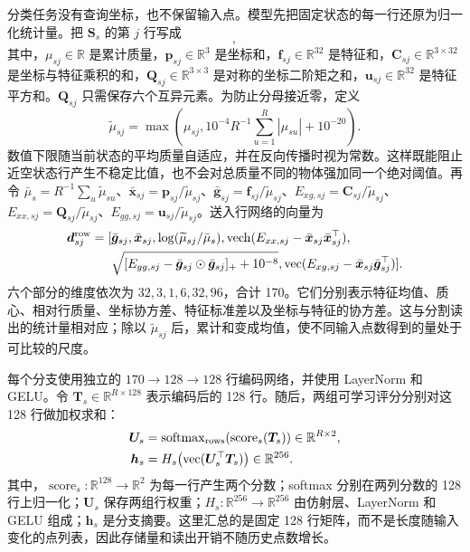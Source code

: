 \documentclass[UTF8,a4paper,11pt,fontset=windows]{ctexart}
\newcommand{\R}{\mathbb{R}}
\newcommand{\Sstate}{\mathbf{S}}
\newcommand{\vect}{\operatorname{vec}}
\begin{document}
分类任务没有查询坐标，也不保留输入点。模型先把固定状态的每一行还原为归一化统计量。把 $\Sstate_s$ 的第 $j$ 行写成
\begin{equation}
[\mu_{sj},\bm p_{sj},\bm f_{sj},\vect(\bm C_{sj}),\operatorname{vech}(\bm Q_{sj}),\bm u_{sj}],
\label{eq:row-sums}
\end{equation}
其中，$\mu_{sj}\in\R$ 是累计质量，$\bm p_{sj}\in\R^3$ 是坐标和，$\bm f_{sj}\in\R^{32}$ 是特征和，$\bm C_{sj}\in\R^{3\times32}$ 是坐标与特征乘积的和，$\bm Q_{sj}\in\R^{3\times3}$ 是对称的坐标二阶矩之和，$\bm u_{sj}\in\R^{32}$ 是特征平方和。$\bm Q_{sj}$ 只需保存六个互异元素。为防止分母接近零，定义
\begin{equation}
\widetilde\mu_{sj}=\max\!\left(\mu_{sj},10^{-4}R^{-1}\sum_{u=1}^{R}|\mu_{su}|+10^{-20}\right).
\end{equation}
数值下限随当前状态的平均质量自适应，并在反向传播时视为常数。这样既能阻止近空状态行产生不稳定比值，也不会对总质量不同的物体强加同一个绝对阈值。再令 $\bar\mu_s=R^{-1}\sum_u\widetilde\mu_{su}$、$\bar{\bm x}_{sj}=\bm p_{sj}/\widetilde\mu_{sj}$、$\bar{\bm g}_{sj}=\bm f_{sj}/\widetilde\mu_{sj}$、$E_{xg,sj}=\bm C_{sj}/\widetilde\mu_{sj}$、$E_{xx,sj}=\bm Q_{sj}/\widetilde\mu_{sj}$、$E_{gg,sj}=\bm u_{sj}/\widetilde\mu_{sj}$。送入行网络的向量为
\begin{equation}
\begin{aligned}
\bm d^{\rm row}_{sj}=[&\bar{\bm g}_{sj},\bar{\bm x}_{sj},
\log(\widetilde\mu_{sj}/\bar\mu_s),
\operatorname{vech}(E_{xx,sj}-\bar{\bm x}_{sj}\bar{\bm x}_{sj}^{\top}),\\
&\sqrt{[E_{gg,sj}-\bar{\bm g}_{sj}\odot\bar{\bm g}_{sj}]_++10^{-8}},
\vect(E_{xg,sj}-\bar{\bm x}_{sj}\bar{\bm g}_{sj}^{\top})].
\end{aligned}
\label{eq:row-descriptor}
\end{equation}
六个部分的维度依次为 $32,3,1,6,32,96$，合计 170。它们分别表示特征均值、质心、相对行质量、坐标协方差、特征标准差以及坐标与特征的协方差。这与分割读出的统计量相对应；除以 $\widetilde\mu_{sj}$ 后，累计和变成均值，使不同输入点数得到的量处于可比较的尺度。

每个分支使用独立的 $170\rightarrow128\rightarrow128$ 行编码网络，并使用 LayerNorm 和 GELU。令 $\bm T_s\in\R^{R\times128}$ 表示编码后的 128 行。随后，两组可学习评分分别对这 128 行做加权求和：
\begin{equation}
\begin{aligned}
\bm U_s&=\operatorname{softmax}_{\rm rows}(\operatorname{score}_s(\bm T_s))
\in\R^{R\times2},\\
\bm h_s&=H_s\!\left(\vect(\bm U_s^\top\bm T_s)\right)\in\R^{256}.
\end{aligned}
\label{eq:state-summary}
\end{equation}
其中，$\operatorname{score}_s:\R^{128}\rightarrow\R^2$ 为每一行产生两个分数；softmax 分别在两列分数的 128 行上归一化；$\bm U_s$ 保存两组行权重；$H_s:\R^{256}\rightarrow\R^{256}$ 由仿射层、LayerNorm 和 GELU 组成；$\bm h_s$ 是分支摘要。这里汇总的是固定 128 行矩阵，而不是长度随输入变化的点列表，因此存储量和读出开销不随历史点数增长。
\end{document}
